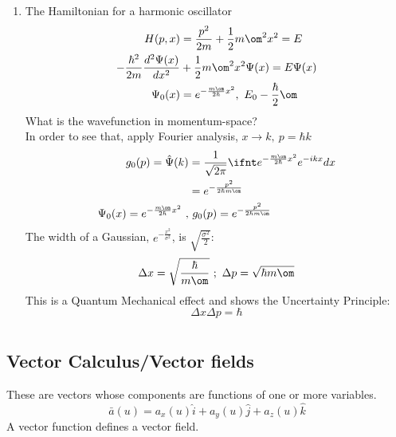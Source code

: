 \documentclass[a4paper, 11pt, normalem]{report}
\begin{document}
\begin{enumerate}
    \item The Hamiltonian for a harmonic oscillator
            \begin{align*}
                H(p, x) &= \frac{p^2}{2m} + \frac{1}{2} m\om^2 x^2 = E \\
                -\frac{\hbar^2}{2m}\frac{d^2 \Psi(x)}{dx^2} &+ \frac{1}{2}m\om^2 x^2 \Psi(x) = E\Psi(x) \\
                \Psi_{0}(x) &= e^{-\frac{m\om}{2\hbar}x^2},~ E_0 - \frac{\hbar}{2}\om
            \end{align*}
          What is the wavefunction in momentum-space? \\
          In order to see that, apply Fourier analysis, $x \to k,~ p = \hbar k$
            \begin{align*}
                g_0(p) = \hat{\Psi}(k) &= \frac{1}{\sqrt{2\pi}} \ifnt e^{-\frac{m\om}{2\hbar}x^2}e^{-ikx}dx \\
                &= e^{-\frac{p^2}{2\hbar m\om}} \\
                \Psi_0(x) = e^{-\frac{m\om}{2\hbar}x^2} ~,&~ g_0(p) = e^{-\frac{p^2}{2\hbar m\om}}
            \end{align*}
          The width of a Gaussian, $e^{-\frac{x^2}{\sigma^2}}$, is $\sqrt{\frac{\sigma^2}{2}}$:
            \begin{equation*}
                \Delta x = \sqrt{\frac{\hbar}{m\om}} ~;~ \Delta p = \sqrt{\hbar m\om}
            \end{equation*}
          This is a Quantum Mechanical effect and shows the Uncertainty Principle:
            \begin{equation*}
                \Delta x \Delta p = \hbar
            \end{equation*}
\end{enumerate}

\chapter{}
\section{Vector Calculus/Vector fields}
These are vectors whose components are functions of one or more variables.
\begin{equation*}
    \bar{a}(u) = a_x (u)\hat{i} + a_y (u)\hat{j} + a_z (u)\hat{k}
\end{equation*}
A vector function defines a vector field.
\end{document}

